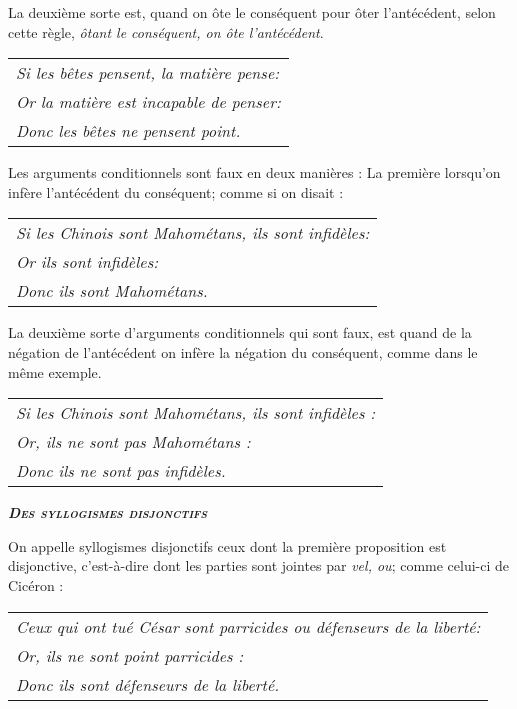La deuxième sorte est, quand on ôte le conséquent pour ôter l'antécédent, selon cette règle, \emph{ôtant le conséquent, on ôte l'antécédent}.

	\begin{tabularx}{\textwidth}{X}
		\emph{Si les bêtes pensent, la matière pense:}  \\
		\emph{Or la matière est incapable de penser:} \\
		\emph{Donc les bêtes ne pensent point.} \\
	\end{tabularx}

Les arguments conditionnels sont faux en deux manières : La première lorsqu'on infère l'antécédent du conséquent; comme si on disait :

	\begin{tabularx}{\textwidth}{X}
		\emph{Si les Chinois sont Mahométans, ils sont infidèles:} \\
		\emph{Or ils sont infidèles:} \\
		\emph{Donc ils sont Mahométans.} \\
	\end{tabularx}

La deuxième sorte d'arguments conditionnels qui sont faux, est quand de la négation de l'antécédent on infère la négation du conséquent, comme dans le même exemple.

	\begin{tabularx}{\textwidth}{X}
		\emph{Si les Chinois sont Mahométans, ils sont infidèles :} \\
		\emph{Or, ils ne sont pas Mahométans :} \\
		\emph{Donc ils ne sont pas infidèles.} \\
	\end{tabularx}


\begin{center}\emph{\scshape\bfseries Des syllogismes disjonctifs}\end{center}

	On appelle syllogismes disjonctifs ceux dont la première proposition est disjonctive, c'est-à-dire dont les parties sont jointes par \emph{vel, ou}; comme celui-ci de Cicéron :

	\begin{tabularx}{\textwidth}{X}
		\emph{Ceux qui ont tué César sont parricides ou défenseurs de la liberté:} \\
		\emph{Or, ils ne sont point parricides : } \\
		\emph{Donc ils sont défenseurs de la liberté.} \\
	\end{tabularx}

